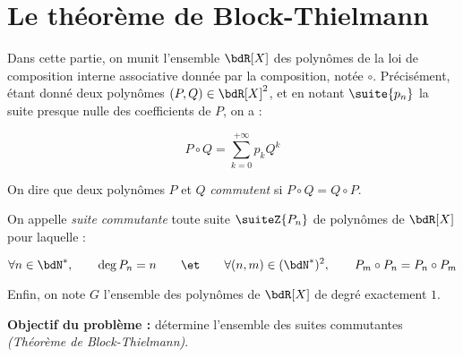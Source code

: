 \documentclass[a4paper,french,bookmarks]{article}
\begin{document}
\section{Le théorème de Block-Thielmann}

Dans cette partie, on munit l'ensemble $\bdR[X]$ des polynômes de la loi de composition interne associative donnée par la composition, notée $\circ$. Précisément, étant donné deux polynômes $(P, Q) \in \bdR[X]^2$, et en notant $\suite{p_n}$ la suite presque nulle des coefficients de $P$, on a :

\begin{equation}
    P \circ Q = \sum_{k=0}^{+\infty} p_kQ^k
\end{equation}

On dire que deux polynômes $P$ et $Q$ \textit{commutent} si $P \circ Q = Q \circ P$.

On appelle \textit{suite commutante} toute suite $\suiteZ{P_n}$ de polynômes de $\bdR[X]$ pour laquelle :

\begin{equation}
    \forall n \in \bdN^*, \qquad \deg P_n = n \qquad\et\qquad \forall (n, m) \in (\bdN^*)^2, \qquad P_m \circ P_n = P_n \circ P_m
\end{equation}

Enfin, on note $G$ l'ensemble des polynômes de $\bdR[X]$ de degré exactement $1$.

\textbf{Objectif du problème :} détermine l'ensemble des suites commutantes \textit{(Théorème de Block-Thielmann)}.
\end{document}
